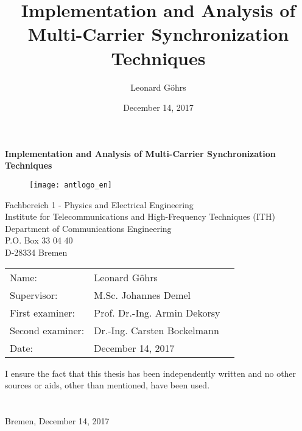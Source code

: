 \newcommand{\mytitle}{Implementation and Analysis of Multi-Carrier Synchronization Techniques}
\newcommand{\myname}{Leonard Göhrs}
\newcommand{\mysupervisor}{M.Sc. Johannes Demel}
\newcommand{\myexaminera}{Prof. Dr.-Ing. Armin Dekorsy}
\newcommand{\myexaminerb}{Dr.-Ing. Carsten Bockelmann}
\newcommand{\mysubdate}{December 14, 2017}

\thispagestyle{empty}
\title{\mytitle}
\author{\myname}
\date{\mysubdate}

\begin{titlepage}
  \noindent

  \vspace{55 mm}

  \begin{center}
    \begin{huge}
      \textbf{\mytitle}
    \end{huge}
  \end{center}

  \vspace{35 mm}

  \begin{figure}[H]
    \centering
    \texttt{[image: antlogo\_en]}
    \\
    \label{img:FrontPage}
  \end{figure}

  \begin{center}
    Fachbereich 1 - Physics and Electrical Engineering \\
    Institute for Telecommunications and High-Frequency Techniques (ITH) \\
    Department of Communications Engineering \\
    P.O. Box 33 04 40 \\
    D-28334 Bremen \\
  \end{center}

  \vfill

  \begin{center}
    \begin{tabular}{lll}
      Name: & \myname \\
      Supervisor: & \mysupervisor \\
      First examiner: & \myexaminera \\
      Second examiner: & \myexaminerb \\
      Date: & \mysubdate
    \end{tabular}
  \end{center}

  \vspace{5mm}
  \noindent I ensure the fact that this thesis has been independently written and no other
  sources or aids, other than mentioned, have been used. \\ \\ \\
  Bremen, \mysubdate \hspace{5mm} \hrulefill

  \newpage
\end{titlepage}
